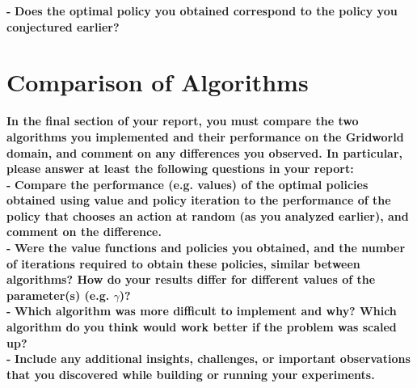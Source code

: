 \documentclass[11pt]{article}
\begin{document}
\noindent
\textbf{-}
\noindent
\textbf{Does the optimal policy you obtained correspond to the policy you
conjectured earlier?}
\\

\section{Comparison of Algorithms}
\textbf{In the final section of your report, you must compare the two algorithms you
implemented and their performance on the Gridworld domain, and comment on any
differences you observed. In particular, please answer at least the following
questions in your report:}
\\

\noindent
\textbf{-}
\noindent
\textbf{Compare the performance (e.g. values) of the optimal policies obtained
using value and policy iteration to the performance of the policy that chooses
an action at random (as you analyzed earlier), and comment on the difference.}
\\

\noindent
\textbf{-}
\noindent
\textbf{Were the value functions and policies you obtained, and the number of
iterations required to obtain these policies, similar between algorithms? How do
your results differ for different values of the parameter(s) (e.g. $\gamma$)?}
\\

\noindent
\textbf{-}
\noindent
\textbf{Which algorithm was more difficult to implement and why? Which algorithm
do you think would work better if the problem was scaled up?}
\\

\noindent
\textbf{-}
\noindent
\textbf{Include any additional insights, challenges, 
or important observations that you discovered while building or
 running your experiments.}
\\
\end{document}
